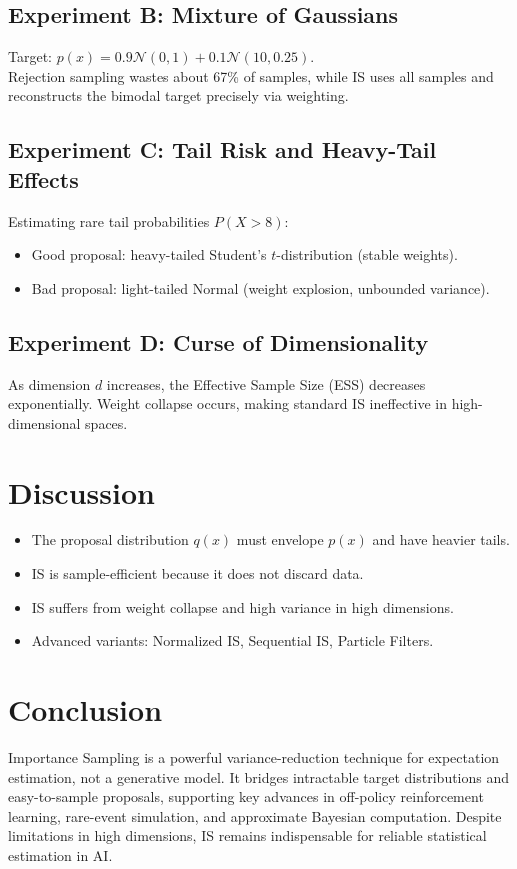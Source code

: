 \documentclass[conference,compsoc]{IEEEtran}
\begin{document}
\subsection{Experiment B: Mixture of Gaussians}
Target: \(p(x) = 0.9\mathcal{N}(0,1) + 0.1\mathcal{N}(10,0.25)\).\\
Rejection sampling wastes about 67\% of samples, while IS uses all samples and reconstructs the bimodal target precisely via weighting.

\subsection{Experiment C: Tail Risk and Heavy-Tail Effects}
Estimating rare tail probabilities \(P(X>8)\):
\begin{itemize}
    \item Good proposal: heavy-tailed Student’s \(t\)-distribution (stable weights).
    \item Bad proposal: light-tailed Normal (weight explosion, unbounded variance).
\end{itemize}

\subsection{Experiment D: Curse of Dimensionality}
As dimension \(d\) increases, the Effective Sample Size (ESS) decreases exponentially. Weight collapse occurs, making standard IS ineffective in high-dimensional spaces.

\section{Discussion}
\begin{itemize}
    \item The proposal distribution \(q(x)\) must envelope \(p(x)\) and have heavier tails.
    \item IS is sample-efficient because it does not discard data.
    \item IS suffers from weight collapse and high variance in high dimensions.
    \item Advanced variants: Normalized IS, Sequential IS, Particle Filters.
\end{itemize}

\section{Conclusion}
Importance Sampling is a powerful variance-reduction technique for expectation estimation, not a generative model. It bridges intractable target distributions and easy-to-sample proposals, supporting key advances in off-policy reinforcement learning, rare-event simulation, and approximate Bayesian computation. Despite limitations in high dimensions, IS remains indispensable for reliable statistical estimation in AI.
\end{document}
